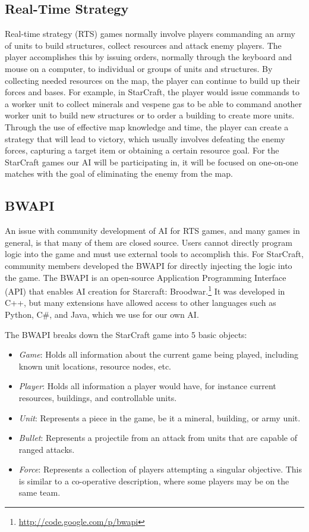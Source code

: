 \documentclass[letterpaper]{article}
\begin{document}
\subsection{Real-Time Strategy} %
Real-time strategy (RTS) games normally involve players commanding an army of units to build structures, collect resources and attack enemy players.
The player accomplishes this by issuing orders, normally through the keyboard and mouse on a computer, to individual or groups of units and structures.  By collecting needed resources on the map, the player can continue to build up their forces and bases.  For example, in StarCraft, the player would issue commands to a worker unit to collect minerals and vespene gas to be able to command another worker unit to build new structures or to order a building to create more units.  Through the use of effective map knowledge and time, the player can create a strategy that will lead to victory, which usually involves defeating the enemy forces, capturing a target item or obtaining a certain resource goal.  For the StarCraft games our AI will be participating in, it will be focused on one-on-one matches with the goal of eliminating the enemy from the map.


\subsection{BWAPI}
An issue with community development of AI for RTS games, and many games in general, is that many of them are closed source.  Users cannot directly program logic into the game and must use external tools to accomplish this.  For StarCraft, community members developed the BWAPI for directly injecting the logic into the game.  The BWAPI is an open-source Application Programming Interface (API) that enables AI creation for Starcraft: Broodwar.\footnote{\url{http://code.google.com/p/bwapi}}  It was developed in C++, but many extensions have allowed access to other languages such as Python, C\#, and Java, which we use for our own AI.

The BWAPI breaks down the StarCraft game into 5 basic objects: 
\begin{itemize}
\item \emph{Game}:  Holds all information about the current game being played, including known unit locations, resource nodes, etc. 
\item \emph{Player}:  Holds all information a player would have, for instance current resources, buildings, and controllable units.
\item \emph{Unit}: Represents a piece in the game, be it a mineral, building, or army unit.
\item \emph{Bullet}: Represents a projectile from an attack from units that are capable of ranged attacks.
\item \emph{Force}: Represents a collection of players attempting a singular objective.  This is similar to a co-operative description, where some players may be on the same team.
\end{itemize}
\end{document}
